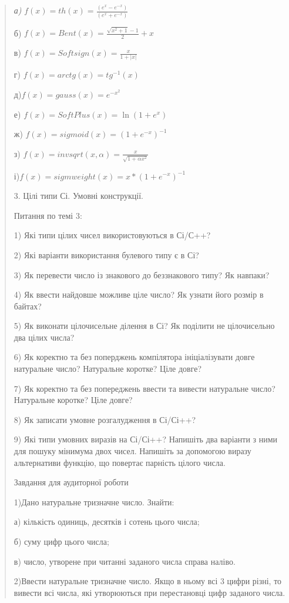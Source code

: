 \documentclass[]{article}
\begin{document}
\begin{quote}
\emph{а)} \(f(x) = th(x) = \frac{(e^{x} - e^{- x})}{(e^{x} + e^{- x})}\)

б) \(f(x) = Bent(x) = \frac{\sqrt{x^{2} + 1} - 1}{2} + x\)

в) \(f(x) = Softsign(x) = \frac{x}{1 + |x|}\)

г) \(f(x) = arctg(x) = tg^{- 1}(x)\)

д)\(f(x) = gauss(x) = e^{- x^{2}}\)

е) \(f(x) = SoftPlus(x) = \ln(1 + e^{x})\)

ж) \(f(x) = sigmoid(x) = {(1 + e^{- x})}^{- 1}\)

з) \(f(x) = invsqrt(x,\alpha) = \frac{x}{\sqrt{1 + \alpha x^{2}}}\)

і)\(f(x) = sigmweight(x) = x*{(1 + e^{- x})}^{- 1}\)

3. Цілі типи Сі. Умовні конструкції.

Питання по темі 3:

1) Які типи цілих чисел використовуються в Сі/С++?

2) Які варіанти використання булевого типу є в Сі?

3) Як перевести число із знакового до беззнакового типу? Як навпаки?

4) Як ввести найдовше можливе ціле число? Як узнати його розмір в
байтах?

5) Як виконати цілочисельне ділення в Сі? Як поділити не цілочисельно
два цілих числа?

6) Як коректно та без поперджень компілятора ініціалізувати довге
натуральне число? Натуральне коротке? Ціле довге?

7) Як коректно та без попереджень ввести та вивести натуральне число?
Натуральне коротке? Ціле довге?

8) Як записати умовне розгалудження в Сі/Сі++?

9) Які типи умовних виразів на Сі/Сі++? Напишіть два варіанти з ними для
пошуку мінимума двох чисел. Напишіть за допомогою виразу альтернативи
функцію, що повертає парність цілого числа.

Завдання для аудиторної роботи

1)Дано натуральне тризначне число. Знайти:

а) кількість одиниць, десятків і сотень цього числа;

б) суму цифр цього числа;

в) число, утворене при читанні заданого числа справа наліво.

2)Ввести натуральне тризначне число. Якщо в ньому всі 3 цифри різні, то
вивести всі числа, які утворюються при перестановці цифр заданого числа.


\end{quote}
\end{document}
